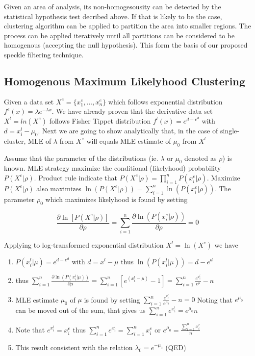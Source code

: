 \documentclass[journal]{IEEEtran}
\begin{document}
Given an area of analysis, its non-homogesousity can be detected by the statistical hypothesis test decribed above. If that is likely to be the case, clustering algorithm can be applied to partition the area into smaller regions. The process can be applied iteratively until all partitions can be considered to be homogenous (accepting the null hypothesis). This form the basis of our proposed speckle filtering technique. 

\subsection{Homogenous Maximum Likelyhood Clustering}

Given a data set $X^e=\{x^e_1,...,x^e_n\}$ which follows exponential distribution $f^e(x)=\lambda e^{-\lambda x} $. We have already proven that the derivative data set $X^l=ln(X^e)$ follows Fisher Tippet distribution $f^l(x) = e^{d-e^d}$ with $d=x^l_i-\mu_0$. Next we are going to show analytically that, in the case of single-cluster, MLE of $\lambda$ from $X^e$ will equals MLE estimate of $\mu_0$ from $X^l$

Assume that the parameter of the distributions (ie. $\lambda$ or $\mu_0$ denoted as $\rho$) is known. MLE strategy maximize the conditional (likelyhood) probability $P(X^e | \rho )$. Product rule indicate that $P(X^e | \rho )=\displaystyle{\prod^n_{i=1}{P(x^e_i | \rho ) }}$. Maximize $P(X^e | \rho )$ also maximizes $\ln(P(X^e | \rho )) = \displaystyle{\sum^n_{i=1}{ \ln(P(x^e_i | \rho )) }}$. The parameter $\rho_0$ which maximizes likelyhood is found by setting 

\begin{equation}
   \displaystyle{ \frac{ \partial{ \ln[P( X^e | \rho )] }  }{\partial{ \rho }} 
= \displaystyle{\sum^n_{i=1}{ \frac{ \partial{ \ln(P(x^e_i | \rho )) } }{ \partial{ \rho } } }} 
= 0 }   
\end{equation}

Applying to log-transformed exponential distribution $X^l = \ln( X^e )$ we have
\begin{enumerate}
 \item $P(x^l_i | \mu) = e^{d - e^d}$ with $d=x^l-\mu $ thus $ \ln( P(x^l_i | \mu) ) = d - e^d$
 \item thus $ \displaystyle{\sum^n_{i=1}{ \frac{ \partial{ \ln(P(x^l_i | \mu )) } }{ \partial{ \mu } } } = \sum^n_{i=1}{[ e^{ (x^l_i - \mu) } - 1 ]} } =  \sum^n_{i=1}{ \frac{ e^{ x^l_i } }{ e^{ \mu }} } - n $
 \item MLE estimate $\mu_0$ of $\mu$ is found by setting $\displaystyle{ \sum^n_{i=1}{ \frac{ e^{ x^l_i } }{ e^{ \mu_0 }}  } - n = 0}$ Noting that $ e^{ \mu_0 }$ can be moved out of the sum, that gives us $\displaystyle{ \sum^n_{i=1}{ e^{ x^l_i } } = e^{\mu_0} n }$
 \item Note that $ e^{ x^l_i } = x^e_i $ thus $\displaystyle{ \sum^n_{i=1}{ e^{ x^l_i } } = \sum^n_{i=1}{x^e_i} }$ or $\displaystyle{ e^{\mu_0} = \frac{ \displaystyle{ \sum^n_{i=1}{x^e_i} }}{n} }$
 \item This result consistent with the relation $\lambda_0 = e^{-\mu_0}$ (QED)
\end{enumerate}
\end{document}
